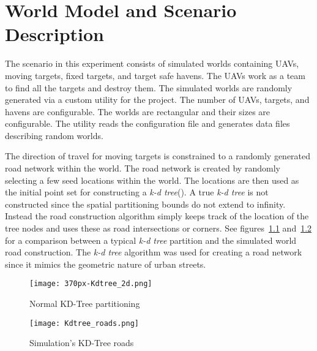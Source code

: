 \chapter{World Model and Scenario Description}

The scenario in this experiment consists of simulated worlds containing UAVs, moving targets, fixed targets, and target safe havens.  The UAVs work as a team to find all the targets and destroy them.  The simulated worlds are randomly generated via a custom utility for the project.  The number of UAVs, targets, and havens are configurable.  The worlds are rectangular and their sizes are configurable.  The utility reads the configuration file and generates data files describing random worlds.


The direction of travel for moving targets is constrained to a randomly generated road network within the world.  The road network is created by randomly selecting a few seed locations within the world.  The locations are then used as the initial point set for constructing a \textit{k-d tree}(\cite{wiki:kdtree}).  A true \textit{k-d tree} is not constructed since the spatial partitioning bounds do not extend to infinity.  Instead the road construction algorithm simply keeps track of the location of the tree nodes and uses these as road intersections or corners.  See figures~\ref{fig:kdtree} and~\ref{fig:kdtreeroads} for a comparison between a typical \textit{k-d tree} partition and the simulated world road construction.  The \textit{k-d tree} algorithm was used for creating a road network since it mimics the geometric nature of urban streets.

\begin{figure}[H]
	\centering
	\texttt{[image: 370px-Kdtree\_2d.png]}
	\caption{Normal KD-Tree partitioning\protect\footnotemark}
	\label{fig:kdtree}
\end{figure}

\begin{figure}[H]
	\centering
	\texttt{[image: Kdtree\_roads.png]}
	\caption{Simulation's KD-Tree roads}
	\label{fig:kdtreeroads}
\end{figure}


